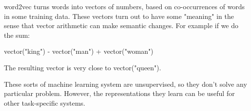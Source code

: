\documentclass{article}
\begin{document}

word2vec turns words into vectors of numbers, based on co-occurrences of
words in some training data. These vectors turn out to have some
"meaning" in the sense that vector arithmetic can make semantic changes.
For example if we do the sum:

  vector("king") - vector("man") + vector("woman")

The resulting vector is very close to vector("queen").

These sorts of machine learning system are unsupervised, so they don't
solve any particular problem. However, the representations they learn
can be useful for other task-specific systems.



\end{document}
